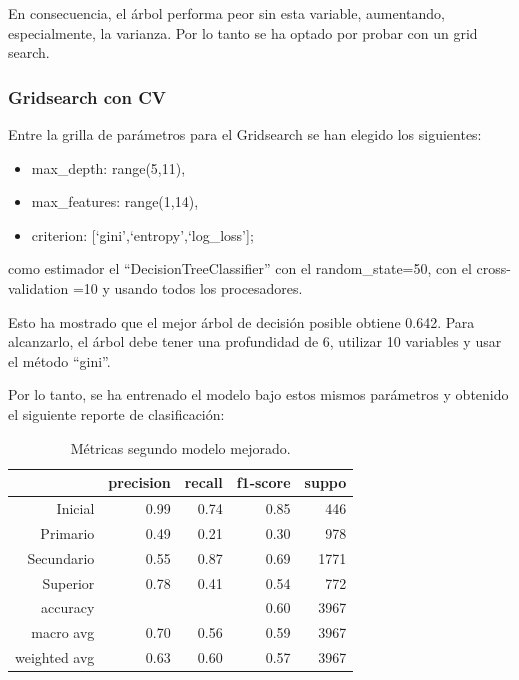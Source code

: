 \documentclass[a4paper]{article}
\begin{document}
            En consecuencia, el árbol performa peor sin esta variable, aumentando, especialmente, la varianza. Por lo tanto se ha optado por probar con un grid search.
        
        \subsubsection{Gridsearch con CV}
            
            Entre la grilla de parámetros para el Gridsearch se han elegido los siguientes:
            \begin{itemize}
                \item max\_depth: range(5,11),
                \item max\_features: range(1,14),
                \item criterion: [`gini',`entropy',`log\_loss'];
            \end{itemize}
            como estimador el ``DecisionTreeClassifier'' con el random\_state=50, con el cross-validation =10 y usando todos los procesadores.
            
\vspace{1cm}

           Esto ha mostrado que el mejor árbol de decisión posible obtiene 0.642. Para alcanzarlo, el árbol debe tener una profundidad de  6, utilizar  10  variables y usar el método ``gini''.

            Por lo tanto, se ha entrenado el modelo bajo estos mismos parámetros y obtenido el siguiente reporte de clasificación:

            \begin{table}[H]
                \centering
                \begin{tabular}{rrrrr}
                    \toprule
                    ~ & precision & recall & f1-score & suppo \\ \midrule
                    Inicial    & 0.99 & 0.74 & 0.85 & 446 \\
                    Primario   & 0.49 & 0.21 & 0.30 & 978 \\
                    Secundario & 0.55 & 0.87 & 0.69 & 1771 \\
                    Superior   & 0.78 & 0.41 & 0.54 & 772 \\
                    accuracy & & & 0.60 & 3967 \\
                    macro avg & 0.70 & 0.56 & 0.59 & 3967 \\
                    weighted avg & 0.63 & 0.60 & 0.57 & 3967 \\
                    \bottomrule
                \end{tabular}
                \caption{Métricas segundo modelo mejorado.}
                \label{New Second model metrics}
            \end{table}
\end{document}
